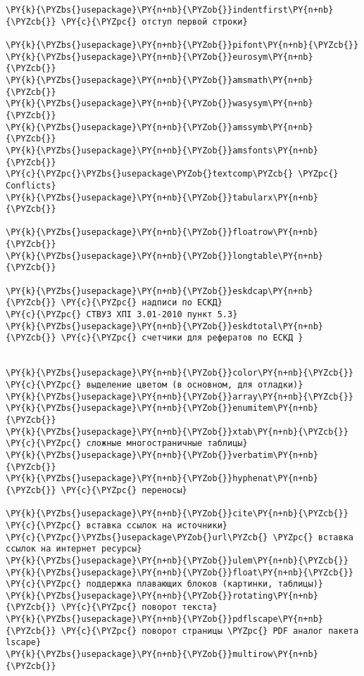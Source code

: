 \begin{Verbatim}[commandchars=\\\{\}]
\PY{k}{\PYZbs{}usepackage}\PY{n+nb}{\PYZob{}}indentfirst\PY{n+nb}{\PYZcb{}} \PY{c}{\PYZpc{} отступ первой строки}

\PY{k}{\PYZbs{}usepackage}\PY{n+nb}{\PYZob{}}pifont\PY{n+nb}{\PYZcb{}}
\PY{k}{\PYZbs{}usepackage}\PY{n+nb}{\PYZob{}}eurosym\PY{n+nb}{\PYZcb{}}
\PY{k}{\PYZbs{}usepackage}\PY{n+nb}{\PYZob{}}amsmath\PY{n+nb}{\PYZcb{}}
\PY{k}{\PYZbs{}usepackage}\PY{n+nb}{\PYZob{}}wasysym\PY{n+nb}{\PYZcb{}}
\PY{k}{\PYZbs{}usepackage}\PY{n+nb}{\PYZob{}}amssymb\PY{n+nb}{\PYZcb{}}
\PY{k}{\PYZbs{}usepackage}\PY{n+nb}{\PYZob{}}amsfonts\PY{n+nb}{\PYZcb{}}
\PY{c}{\PYZpc{}\PYZbs{}usepackage\PYZob{}textcomp\PYZcb{} \PYZpc{} Conflicts}
\PY{k}{\PYZbs{}usepackage}\PY{n+nb}{\PYZob{}}tabularx\PY{n+nb}{\PYZcb{}}

\PY{k}{\PYZbs{}usepackage}\PY{n+nb}{\PYZob{}}floatrow\PY{n+nb}{\PYZcb{}}
\PY{k}{\PYZbs{}usepackage}\PY{n+nb}{\PYZob{}}longtable\PY{n+nb}{\PYZcb{}}

\PY{k}{\PYZbs{}usepackage}\PY{n+nb}{\PYZob{}}eskdcap\PY{n+nb}{\PYZcb{}} \PY{c}{\PYZpc{} надписи по ЕСКД}
\PY{c}{\PYZpc{} СТВУЗ ХПІ 3.01-2010 пункт 5.3}
\PY{k}{\PYZbs{}usepackage}\PY{n+nb}{\PYZob{}}eskdtotal\PY{n+nb}{\PYZcb{}} \PY{c}{\PYZpc{} счетчики для рефератов по ЕСКД }


\PY{k}{\PYZbs{}usepackage}\PY{n+nb}{\PYZob{}}color\PY{n+nb}{\PYZcb{}} \PY{c}{\PYZpc{} выделение цветом (в основном, для отладки)}
\PY{k}{\PYZbs{}usepackage}\PY{n+nb}{\PYZob{}}array\PY{n+nb}{\PYZcb{}}
\PY{k}{\PYZbs{}usepackage}\PY{n+nb}{\PYZob{}}enumitem\PY{n+nb}{\PYZcb{}}
\PY{k}{\PYZbs{}usepackage}\PY{n+nb}{\PYZob{}}xtab\PY{n+nb}{\PYZcb{}} \PY{c}{\PYZpc{} сложные многостраничные таблицы}
\PY{k}{\PYZbs{}usepackage}\PY{n+nb}{\PYZob{}}verbatim\PY{n+nb}{\PYZcb{}} 
\PY{k}{\PYZbs{}usepackage}\PY{n+nb}{\PYZob{}}hyphenat\PY{n+nb}{\PYZcb{}} \PY{c}{\PYZpc{} переносы}

\PY{k}{\PYZbs{}usepackage}\PY{n+nb}{\PYZob{}}cite\PY{n+nb}{\PYZcb{}} \PY{c}{\PYZpc{} вставка ссылок на источники}
\PY{c}{\PYZpc{}\PYZbs{}usepackage\PYZob{}url\PYZcb{} \PYZpc{} вставка ссылок на интернет ресурсы}
\PY{k}{\PYZbs{}usepackage}\PY{n+nb}{\PYZob{}}ulem\PY{n+nb}{\PYZcb{}}
\PY{k}{\PYZbs{}usepackage}\PY{n+nb}{\PYZob{}}float\PY{n+nb}{\PYZcb{}} \PY{c}{\PYZpc{} поддержка плавающих блоков (картинки, таблицы)}
\PY{k}{\PYZbs{}usepackage}\PY{n+nb}{\PYZob{}}rotating\PY{n+nb}{\PYZcb{}} \PY{c}{\PYZpc{} поворот текста}
\PY{k}{\PYZbs{}usepackage}\PY{n+nb}{\PYZob{}}pdflscape\PY{n+nb}{\PYZcb{}} \PY{c}{\PYZpc{} поворот страницы \PYZpc{} PDF аналог пакета lscape}
\PY{k}{\PYZbs{}usepackage}\PY{n+nb}{\PYZob{}}multirow\PY{n+nb}{\PYZcb{}}


\end{Verbatim}
